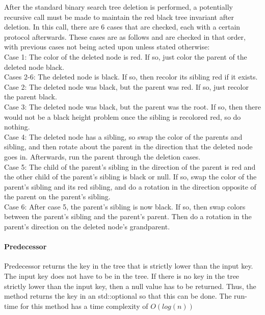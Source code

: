 \documentclass{article}
\begin{document}
\noindent
After the standard binary search tree deletion is performed, a potentially recursive call must be made to maintain the red black tree invariant after deletion. In this call, there are 6 cases that are checked, each with a certain protocol afterwards. These cases are as follows and are checked in that order, with previous cases not being acted upon unless stated otherwise:
\\

\noindent
Case 1: The color of the deleted node is red. If so, just color the parent of the deleted node black.
\\

\noindent
Cases 2-6: The deleted node is black. If so, then recolor its sibling red if it exists.
\\
\noindent
Case 2: The deleted node was black, but the parent was red. If so, just recolor the parent black.
\\

\noindent
Case 3: The deleted node was black, but the parent was the root. If so, then there would not be a black height problem once the sibling is recolored red, so do nothing.
\\

\noindent
Case 4: The deleted node has a sibling, so swap the color of the parents and sibling, and then rotate about the parent in the direction that the deleted node goes in. Afterwards, run the parent through the deletion cases.
\\

\noindent
Case 5: The child of the parent’s sibling in the direction of the parent is red and the other child of the parent’s sibling is black or null. If so, swap the color of the parent's sibling and its red sibling, and do a rotation in the direction opposite of the parent on the parent's sibling.
\\

\noindent
Case 6: After case 5, the parent's sibling is now black. If so, then swap colors between the parent's sibling and the parent's parent. Then do a rotation in the parent's direction on the deleted node's grandparent.
\\

\paragraph{Predecessor}

\noindent
Predecessor returns the key in the tree that is strictly lower than the input key. The input key does not have to be in the tree. If there is no key in the tree strictly lower than the input key, then a null value has to be returned. Thus, the method returns the key in an std::optional so that this can be done. The run-time for this method has a time complexity of $O(log(n))$
\\
\end{document}
